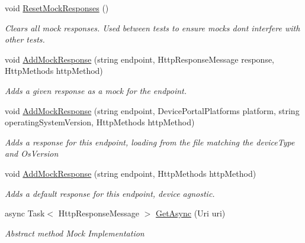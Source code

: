 \begin{DoxyCompactItemize}
\item 
void \hyperlink{class_microsoft_1_1_tools_1_1_windows_device_portal_1_1_tests_1_1_mock_http_responder_ad3d6733af37ce0cd90fba18f0bcd2be0}{Reset\+Mock\+Responses} ()
\begin{DoxyCompactList}\small\item\em Clears all mock responses. Used between tests to ensure mocks don\textquotesingle{}t interfere with other tests. \end{DoxyCompactList}\item 
void \hyperlink{class_microsoft_1_1_tools_1_1_windows_device_portal_1_1_tests_1_1_mock_http_responder_a71e8c0cb9ebdd89b8d84175829303f0d}{Add\+Mock\+Response} (string endpoint, Http\+Response\+Message response, Http\+Methods http\+Method)
\begin{DoxyCompactList}\small\item\em Adds a given response as a mock for the endpoint. \end{DoxyCompactList}\item 
void \hyperlink{class_microsoft_1_1_tools_1_1_windows_device_portal_1_1_tests_1_1_mock_http_responder_ab44cb18771e48ebab84e97de0bb946ca}{Add\+Mock\+Response} (string endpoint, Device\+Portal\+Platforms platform, string operating\+System\+Version, Http\+Methods http\+Method)
\begin{DoxyCompactList}\small\item\em Adds a response for this endpoint, loading from the file matching the device\+Type and Os\+Version \end{DoxyCompactList}\item 
void \hyperlink{class_microsoft_1_1_tools_1_1_windows_device_portal_1_1_tests_1_1_mock_http_responder_ab3a8c3e12380e27062759ff3d4402a0e}{Add\+Mock\+Response} (string endpoint, Http\+Methods http\+Method)
\begin{DoxyCompactList}\small\item\em Adds a default response for this endpoint, device agnostic. \end{DoxyCompactList}\item 
async Task$<$ Http\+Response\+Message $>$ \hyperlink{class_microsoft_1_1_tools_1_1_windows_device_portal_1_1_tests_1_1_mock_http_responder_a9ddff3ac2a7792f57ce28b7259135e4d}{Get\+Async} (Uri uri)
\begin{DoxyCompactList}\small\item\em Abstract method Mock Implementation \end{DoxyCompactList}\item 

\end{DoxyCompactItemize}
